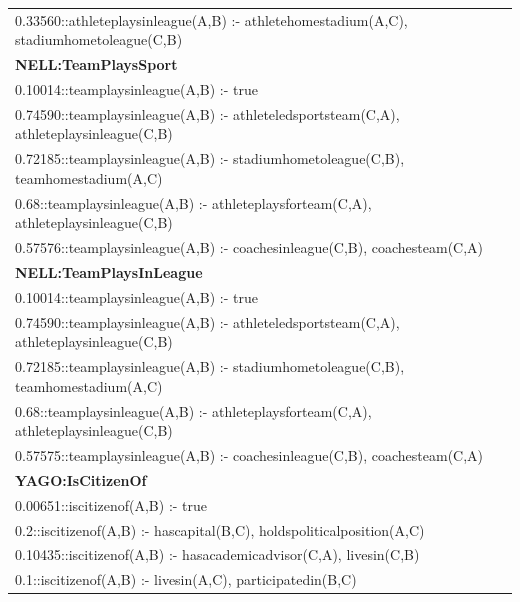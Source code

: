 \documentclass[akbc,twoside,11pt]{article}
\begin{document}
\begin{footnotesize}
\begin{tabular}{|l|}
0.33560::athleteplaysinleague(A,B) :- athletehomestadium(A,C), stadiumhometoleague(C,B) \\[2ex]
\textbf{NELL:TeamPlaysSport}  \\
0.10014::teamplaysinleague(A,B) :- true \\
0.74590::teamplaysinleague(A,B) :- athleteledsportsteam(C,A), athleteplaysinleague(C,B) \\
0.72185::teamplaysinleague(A,B) :- stadiumhometoleague(C,B), teamhomestadium(A,C) \\
0.68::teamplaysinleague(A,B) :- athleteplaysforteam(C,A), athleteplaysinleague(C,B) \\
0.57576::teamplaysinleague(A,B) :- coachesinleague(C,B), coachesteam(C,A) \\[2ex]
\textbf{NELL:TeamPlaysInLeague} \\
0.10014::teamplaysinleague(A,B) :- true \\
0.74590::teamplaysinleague(A,B) :- athleteledsportsteam(C,A), athleteplaysinleague(C,B) \\
0.72185::teamplaysinleague(A,B) :- stadiumhometoleague(C,B), teamhomestadium(A,C) \\
0.68::teamplaysinleague(A,B) :- athleteplaysforteam(C,A), athleteplaysinleague(C,B) \\
0.57575::teamplaysinleague(A,B) :- coachesinleague(C,B), coachesteam(C,A) \\[2ex]
\textbf{YAGO:IsCitizenOf} \\
0.00651::iscitizenof(A,B) :- true \\
0.2::iscitizenof(A,B) :- hascapital(B,C), holdspoliticalposition(A,C) \\
0.10435::iscitizenof(A,B) :- hasacademicadvisor(C,A), livesin(C,B) \\
0.1::iscitizenof(A,B) :- livesin(A,C), participatedin(B,C) \\
\hline
\end{tabular}\\
\end{footnotesize}
\end{document}
